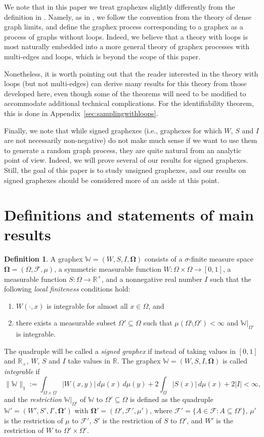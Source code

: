 \documentclass{amsart}
\numberwithin{equation}{section}
\numberwithin{figure}{section}
\theoremstyle{definition}
\newtheorem{definition}[theorem]{Definition}
\theoremstyle{remark}
\newcommand{\bOmega}{{\mathbf{\Omega}}}
\newcommand{\RR}{\mathbb{R}}
\newcommand{\cW}{\mathbb{W}}
\newcommand{\cF}{\mathcal{F}}
\begin{document}
We note that in this paper we treat graphexes slightly differently from the
definition in \cite{VR15,JANSON16,VR16,JANSON17,BCCV17}. Namely, as in
\cite{BCCH16}, we follow the convention from the theory of dense graph
limits, and define the graphex process corresponding to a graphex as a
process of graphs without loops. Indeed, we believe that a theory with loops
is most naturally embedded into a more general theory of graphex processes
with multi-edges and loops, which is beyond the scope of this paper.

Nonetheless, it is worth pointing out that the reader interested in the theory with
loops (but not multi-edges) can derive many results for this theory from
those developed here, even though some of the theorems will need to be
modified to accommodate additional technical complications. For the
identifiability theorem, this is done in
Appendix~\ref{sec:samplingwithloops}.

Finally, we note that while signed graphexes (i.e., graphexes for which $W$,
$S$ and $I$ are not necessarily non-negative) do not make much sense if we
want to use them to generate a random graph process, they are quite natural
from an analytic point of view. Indeed, we will prove several of our results
for signed graphexes. Still, the goal of this paper is to study unsigned
graphexes, and our results on signed graphexes should be considered more of
an aside at this point.

\section{Definitions and statements of main results}
\label{sec:defs}

\begin{definition}\label{def:graphex}
A graphex $\cW=(W,S,I,\bOmega)$ consists of a $\sigma$-finite measure space
$\bOmega=(\Omega,\cF,\mu)$, a symmetric measurable function $W\colon \Omega
\times \Omega \rightarrow [0,1]$, a measurable function $S\colon \Omega
\rightarrow \RR^+$, and a nonnegative real number $I$ such that the following
\emph{local finiteness} conditions hold:
\begin{enumerate}
\item $W(\cdot, x)$ is integrable for almost all $x\in\Omega$, and
\item there exists a measurable subset $\Omega' \subseteq \Omega$ such that
    $\mu(\Omega \setminus \Omega')<\infty$ and $\cW|_{\Omega'}$ is
 integrable.
\end{enumerate}
The quadruple will be called a \emph{signed graphex} if instead of taking
values in $[0,1]$ and $\RR_+$, $W$, $S$ and $I$ take values in $\RR$. The
graphex $\cW=(W,S,I,\bOmega)$ is called \emph{integrable} if
\[\|\cW\|_1 :=\int_{\Omega \times \Omega} |W(x,y)|\,d\mu(x)\,d\mu(y) + 2 \int_\Omega |S(x)| \,d\mu(x)
+2|I|<\infty,\] and the \emph{restriction} $\cW|_{\Omega'}$ of $\cW$ to
$\Omega' \subseteq \Omega$ is defined as the quadruple
$\cW'=(W',S',I',\bOmega')$ with $\bOmega'=(\Omega',\cF',\mu')$, where
$\cF'=\{A\in \cF : A\subseteq\Omega'\}$, $\mu'$ is the restriction of $\mu$
to $\cF'$, $S'$ is the restriction of $S$ to $\Omega'$, and $W'$ is the
restriction of $W$ to $\Omega'\times\Omega'$.
\end{definition}
\end{document}
